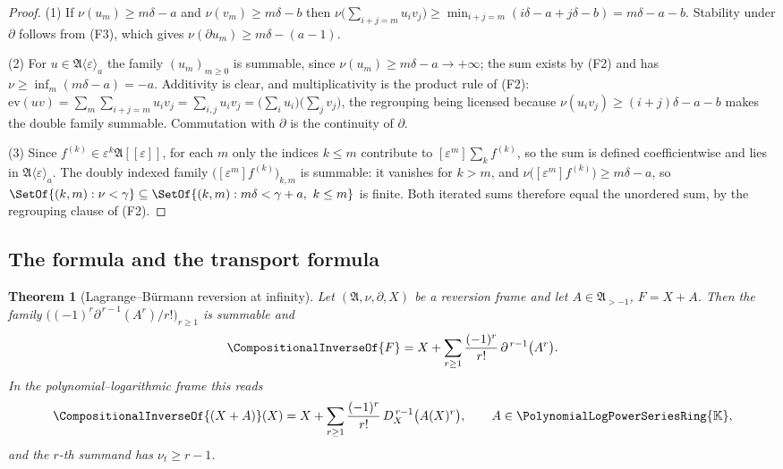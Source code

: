 \documentclass[11pt,oneside]{article}
\theoremstyle{plain}
\newtheorem{theorem}{Theorem}[section]
\theoremstyle{definition}
\theoremstyle{remark}
\newcommand{\K}{\mathbb{K}}
\newcommand{\PLpow}{\PolynomialLogPowerSeriesRing{\K}}   %
\newcommand{\ordt}{\nu_{t}}                              %
\newcommand{\DX}{D_{X}}                                  %
\newcommand{\rev}[1]{\CompositionalInverseOf{#1}}
\begin{document}
\begin{proof}
(1)  If \(\nu(u_m)\ge m\delta-a\) and \(\nu(v_m)\ge m\delta-b\) then
\(\nu\bigl(\sum_{i+j=m}u_iv_j\bigr)\ge\min_{i+j=m}(i\delta-a+j\delta-b)
=m\delta-a-b\).  Stability under \(\partial\) follows from (F3), which gives
\(\nu(\partial u_m)\ge m\delta-(a-1)\).

(2)  For \(u\in\mathfrak A\langle\varepsilon\rangle_a\) the family
\((u_m)_{m\ge0}\) is summable, since \(\nu(u_m)\ge m\delta-a\to+\infty\); the
sum exists by (F2) and has \(\nu\ge\inf_m(m\delta-a)=-a\).  Additivity is
clear, and multiplicativity is the product rule of (F2):
\(\mathrm{ev}(uv)=\sum_m\sum_{i+j=m}u_iv_j=\sum_{i,j}u_iv_j
=\bigl(\sum_iu_i\bigr)\bigl(\sum_jv_j\bigr)\), the regrouping being licensed
because \(\nu(u_iv_j)\ge(i+j)\delta-a-b\) makes the double family summable.
Commutation with \(\partial\) is the continuity of \(\partial\).

(3)  Since \(f^{(k)}\in\varepsilon^k\mathfrak A[[\varepsilon]]\), for each \(m\)
only the indices \(k\le m\) contribute to \([\varepsilon^m]\sum_kf^{(k)}\), so
the sum is defined coefficientwise and lies in
\(\mathfrak A\langle\varepsilon\rangle_a\).  The doubly indexed family
\(\bigl([\varepsilon^m]f^{(k)}\bigr)_{k,m}\) is summable: it vanishes for
\(k>m\), and \(\nu\bigl([\varepsilon^m]f^{(k)}\bigr)\ge m\delta-a\), so
\(\SetOf{(k,m):\nu<\gamma}\subseteq
\SetOf{(k,m):m\delta<\gamma+a,\ k\le m}\) is finite.  Both iterated sums
therefore equal the unordered sum, by the regrouping clause of (F2).
\end{proof}

\subsection{The formula and the transport formula}
\label{plt:sec:lag-main}

\begin{theorem}[Lagrange--B\"urmann reversion at infinity]
\label{plt:thm:lag-burmann}
Let \((\mathfrak A,\nu,\partial,X)\) be a reversion frame and let
\(A\in\mathfrak A_{>-1}\), \(F=X+A\).  Then the family
\(\bigl((-1)^r\partial^{\,r-1}(A^r)/r!\bigr)_{r\ge1}\) is summable and
\begin{equation}
\label{plt:eq:lag-burmann}
  \rev{F}
  =X+\sum_{r\ge1}\frac{(-1)^r}{r!}\,\partial^{\,r-1}\bigl(A^r\bigr).
\end{equation}
In the polynomial--logarithmic frame this reads
\begin{equation}
\label{plt:eq:lag-burmann-pl}
  \rev{(X+A)}(X)
  =X+\sum_{r\ge1}\frac{(-1)^r}{r!}\,\DX^{\,r-1}\bigl(A(X)^r\bigr),
  \qquad A\in\PLpow ,
\end{equation}
and the \(r\)-th summand has \(\ordt\ge r-1\).
\end{theorem}
\end{document}
